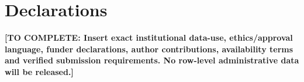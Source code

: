 \documentclass[11pt]{article}
\newcommand{\pending}[1]{\textbf{[TO COMPLETE: #1]}}
\begin{document}
\section*{Declarations}
\pending{Insert exact institutional data-use, ethics/approval language, funder declarations, author contributions, availability terms and verified submission requirements. No row-level administrative data will be released.}



\end{document}
